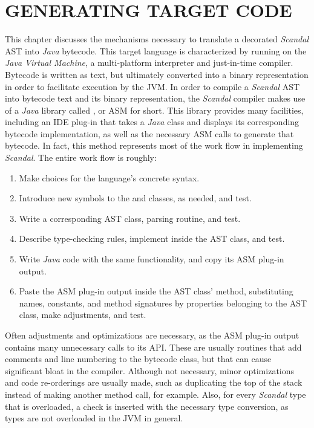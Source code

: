 \chapter{GENERATING TARGET CODE}

This chapter discusses the mechanisms necessary to translate a decorated \emph{Scandal} AST into \emph{Java} bytecode. This target language is characterized by running on the \emph{Java Virtual Machine}, a multi-platform interpreter and just-in-time compiler. Bytecode is written as text, but ultimately converted into a binary representation in order to facilitate execution by the JVM. In order to compile a \emph{Scandal} AST into bytecode text and its binary representation, the \emph{Scandal} compiler makes use of a \emph{Java} library called , or ASM for short. This library provides many facilities, including an IDE plug-in that takes a \emph{Java} class and displays its corresponding bytecode implementation, as well as the necessary ASM calls to generate that bytecode. In fact, this method represents most of the work flow in implementing \emph{Scandal}. The entire work flow is roughly:

\begin{enumerate}
	\item Make choices for the language's concrete syntax.
	\item Introduce new symbols to the  and  classes, as needed, and test.
	\item Write a corresponding AST class, parsing routine, and test.
	\item Describe type-checking rules, implement  inside the AST class, and test.
	\item Write \emph{Java} code with the same functionality, and copy its ASM plug-in output.
	\item Paste the ASM plug-in output inside the AST class'  method, substituting names, constants, and method signatures by properties belonging to the AST class, make adjustments, and test.
\end{enumerate}

Often adjustments and optimizations are necessary, as the ASM plug-in output contains many unnecessary calls to its API. These are usually routines that add comments and line numbering to the bytecode class, but that can cause significant bloat in the compiler. Although not necessary, minor optimizations and code re-orderings are usually made, such as duplicating the top of the stack instead of making another method call, for example. Also, for every \emph{Scandal} type that is overloaded, a check is inserted with the necessary type conversion, as types are not overloaded in the JVM in general.

